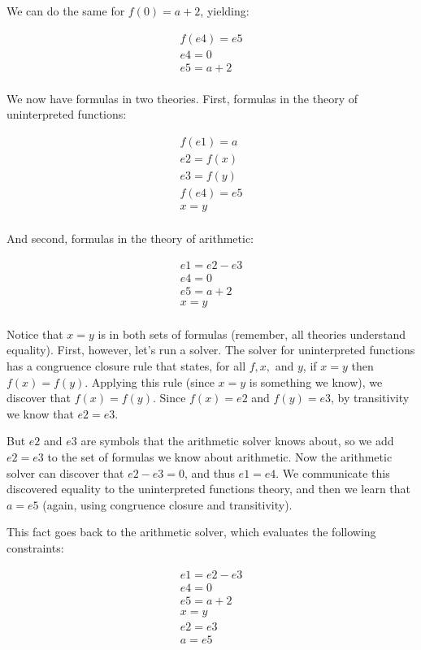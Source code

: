 \documentclass[11pt]{article}
\begin{document}
We can do the same for $f(0) = a+2$, yielding:

\[
\begin{array}{l}
f(e4) = e5 \\
e4 = 0 \\
e5 = a + 2 \\
\end{array}
\]

We now have formulas in two theories. First, formulas in the theory of
uninterpreted functions:

\[
\begin{array}{l}
f(e1) = a \\
e2 = f(x) \\
e3 = f(y) \\
f(e4) = e5 \\
x = y \\
\end{array}
\]

And second, formulas in the theory of arithmetic:

\[
\begin{array}{l}
e1 = e2 - e3 \\
e4 = 0 \\
e5 = a + 2 \\
x = y \\
\end{array}
\]

Notice that $x = y$ is in both sets of formulas (remember, all theories
understand equality). First, however, let's run a solver. The solver for
uninterpreted functions has a congruence closure rule that states, for all
$f, x,$ and $y$, if $x = y$ then $f(x) = f(y)$. Applying this rule (since $x=y$
is something we know), we discover that $f(x) = f(y)$. Since $f(x) = e2$ and
$f(y) = e3$, by transitivity we know that $e2 = e3$.

But $e2$ and $e3$ are symbols that the arithmetic solver knows about, so we add
$e2=e3$ to the set of formulas we know about arithmetic. Now the arithmetic
solver can discover that $e2-e3 = 0$, and thus $e1 = e4$. We communicate this
discovered equality to the uninterpreted functions theory, and then we learn
that $a = e5$ (again, using congruence closure and transitivity).

This fact goes back to the arithmetic solver, which evaluates the following
constraints:

\[
\begin{array}{l}
e1 = e2 - e3 \\
e4 = 0 \\
e5 = a + 2 \\
x = y \\
e2 = e3 \\
a = e5 \\
\end{array}
\]
\end{document}
